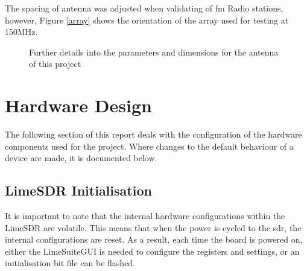 \documentclass[class=report,11pt,crop=false]{standalone}
\begin{document}
The spacing of antenna was adjusted when validating of \gls{fm} Radio stations, however, Figure \ref{array} shows the orientation of the array used for testing at 150MHz. 
\begin{figure}[h]\centering
    \hspace{.5cm}
    \hfill 
    \caption{Further details into the parameters and dimensions for the antenna of this project}
    \label{fig:antenna}
\end{figure}

\section{Hardware Design}\label{sec:Design/HardwareDesign}
The following section of this report deals with the configuration of the hardware components used for the project. Where changes to the default behaviour of a device are made, it is documented below. 

\subsection{LimeSDR Initialisation}
It is important to note that the internal hardware configurations within the LimeSDR are volatile. This means that when the power is cycled to the \gls{sdr}, the internal configurations are reset. As a result, each time the board is powered on, either the LimeSuiteGUI is needed to configure the registers and settings, or an initialisation bit file can be flashed. 
\end{document}
